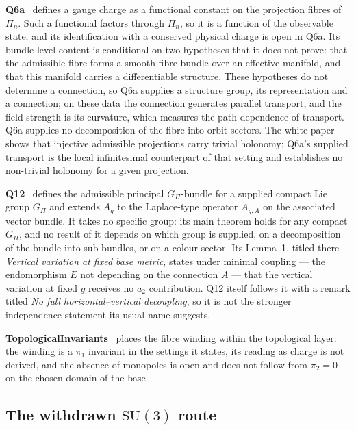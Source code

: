 \documentclass[11pt,a4paper]{article}
\theoremstyle{definition}
\newcommand{\SU}{\mathrm{SU}}
\newcommand{\Gpi}{G_{\Pi}}
\begin{document}
      \textbf{Q6a}~\cite{Beau2026q6a} defines a gauge charge as a functional constant on the
      projection fibres of $\Pi_n$.
      Such a functional factors through $\Pi_n$, so it is a function of the observable state, and its
      identification with a conserved physical charge is open in Q6a.
      Its bundle-level content is conditional on two hypotheses that it does not prove: that the
      admissible fibre forms a smooth fibre bundle over an effective manifold, and that this
      manifold carries a differentiable structure.
      These hypotheses do not determine a connection, so Q6a supplies a structure group, its
      representation and a connection; on these data the connection generates parallel transport, and
      the field strength is its curvature, which measures the path dependence of transport.
      Q6a supplies no decomposition of the fibre into orbit sectors.
      The white paper shows that injective admissible projections carry trivial holonomy; Q6a's
      supplied transport is the local infinitesimal counterpart of that setting and establishes no
      non-trivial holonomy for a given projection.

      \textbf{Q12}~\cite{Beau2026q12} defines the admissible principal $\Gpi$-bundle for a supplied
      compact Lie group $\Gpi$ and extends $A_g$ to the Laplace-type operator $A_{g,A}$ on the
      associated vector bundle.
      It takes no specific group: its main theorem holds for any compact $\Gpi$, and no result of
      it depends on which group is supplied, on a decomposition of the bundle into sub-bundles, or
      on a colour sector.
      Its Lemma~1, titled there \emph{Vertical variation at fixed base metric}, states under
      minimal coupling --- the endomorphism $E$ not depending on the connection $A$ --- that the
      vertical variation at fixed $g$ receives no $a_2$ contribution.
      Q12 itself follows it with a remark titled \emph{No full horizontal--vertical decoupling}, so
      it is not the stronger independence statement its usual name suggests.

      \textbf{TopologicalInvariants}~\cite{Beau2026k} places the fibre winding within the
      topological layer: the winding is a $\pi_1$ invariant in the settings it states, its reading as
      charge is not derived, and the absence of monopoles is open and does not follow from
      $\pi_2 = 0$ on the chosen domain of the base.

    \subsection{The withdrawn \texorpdfstring{$\SU(3)$}{SU(3)} route}
      \label{sec:su3}
\end{document}

